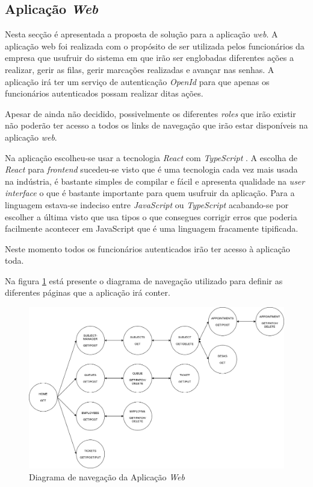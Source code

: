 \documentclass[12pt,a4paper]{article}
\begin{document}
\subsection{Aplicação \textit{Web}}
Nesta secção é apresentada a proposta de solução para a aplicação \textit{web}. A aplicação web foi realizada com o propósito de ser utilizada pelos funcionários 
da empresa que usufruir do sistema em que irão ser englobadas diferentes ações a realizar, gerir as filas, gerir marcações realizadas e avançar nas senhas.
A aplicação irá ter um serviço de autenticação \textit{OpenId} para que apenas os funcionários autenticados possam realizar ditas ações.\par
Apesar de ainda não decidido, possivelmente os diferentes \textit{roles} que irão existir não poderão ter acesso a todos os links de navegação que 
irão estar disponíveis na aplicação \textit{web}.\par
Na aplicação escolheu-se usar a tecnologia \textit{React} \cite{reactReference} com \textit{TypeScript} \cite{typescriptReference}. A escolha de \textit{React}
para \textit{frontend} sucedeu-se visto que é uma tecnologia cada vez mais usada na indústria, é bastante simples de compilar e fácil e apresenta qualidade na \textit{user interface} 
o que é bastante importante para quem usufruir da aplicação. Para a linguagem estava-se indeciso entre \textit{JavaScript} ou \textit{TypeScript} acabando-se por escolher a última visto que
usa tipos o que consegues corrigir erros que poderia facilmente acontecer em JavaScript que é uma linguagem fracamente tipificada.\par
Neste momento todos os funcionários autenticados irão ter acesso à aplicação toda.\par
Na figura \ref{fig:figure2} está presente o diagrama de navegação utilizado para definir as diferentes páginas que a aplicação irá conter.
\begin{landscape}
    \begin{figure}
        \centering
        \includegraphics[scale=0.5]{Hypermedia-Navigation}
        \caption{Diagrama de navegação da Aplicação \textit{Web}}
        \label{fig:figure2}
    \end{figure}
\end{landscape} 
\end{document}
